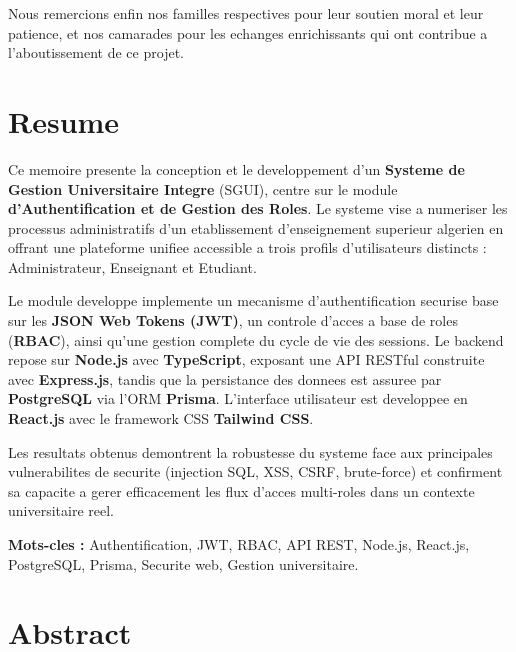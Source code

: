 \documentclass[12pt,a4paper]{report}
\begin{document}
Nous remercions enfin nos familles respectives pour leur soutien moral
et leur patience, et nos camarades pour les echanges enrichissants qui
ont contribue a l'aboutissement de ce projet.

\chapter*{Resume}

Ce memoire presente la conception et le developpement d'un \textbf{Systeme
de Gestion Universitaire Integre} (SGUI), centre sur le module
\textbf{d'Authentification et de Gestion des Roles}. Le systeme vise a
numeriser les processus administratifs d'un etablissement d'enseignement
superieur algerien en offrant une plateforme unifiee accessible a trois
profils d'utilisateurs distincts : Administrateur, Enseignant et Etudiant.

Le module developpe implemente un mecanisme d'authentification securise
base sur les \textbf{JSON Web Tokens (JWT)}, un controle d'acces a base
de roles (\textbf{RBAC}), ainsi qu'une gestion complete du cycle de vie
des sessions. Le backend repose sur \textbf{Node.js} avec \textbf{TypeScript},
exposant une API RESTful construite avec \textbf{Express.js}, tandis que
la persistance des donnees est assuree par \textbf{PostgreSQL} via l'ORM
\textbf{Prisma}. L'interface utilisateur est developpee en
\textbf{React.js} avec le framework CSS \textbf{Tailwind CSS}.

Les resultats obtenus demontrent la robustesse du systeme face aux
principales vulnerabilites de securite (injection SQL, XSS, CSRF,
brute-force) et confirment sa capacite a gerer efficacement les flux
d'acces multi-roles dans un contexte universitaire reel.

\vspace{0.5cm}
\textbf{Mots-cles :} Authentification, JWT, RBAC, API REST, Node.js,
React.js, PostgreSQL, Prisma, Securite web, Gestion universitaire.

\chapter*{Abstract}
\end{document}
